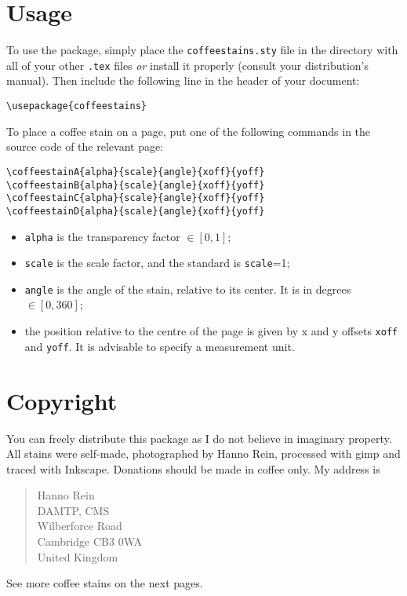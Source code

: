 \documentclass[a4paper, 11pt, BCOR = 0 pt, oneside, english]{scrartcl}
\begin{document}
\section{Usage}
To use the package, simply place the \texttt{coffeestains.sty} file in the directory with all of your 
other \texttt{.tex} files \textit{or} install it properly (consult your distribution's manual). 
Then include the following line in the header of your document:
\begin{verbatim}
\usepackage{coffeestains}
\end{verbatim}
\newpage{}
  \pagestyle{page2}
To place a coffee stain on a page, put one of the following commands in the source code of the relevant page: 
\begin{verbatim}
\coffeestainA{alpha}{scale}{angle}{xoff}{yoff}
\coffeestainB{alpha}{scale}{angle}{xoff}{yoff}
\coffeestainC{alpha}{scale}{angle}{xoff}{yoff}
\coffeestainD{alpha}{scale}{angle}{xoff}{yoff}
\end{verbatim}
\begin{itemize}
\item \texttt{alpha} is the transparency factor $\in [0,1]$;
\item \texttt{scale} is the scale factor, and the standard is \texttt{scale}=1;
\item \texttt{angle} is the angle of the stain, relative to its center. It is in
  degrees $\in [0,360]$;
\item the position relative to the centre of the page is given by x and
  y offsets \texttt{xoff} and \texttt{yoff}. It is advisable to specify
  a measurement unit.
\end{itemize}


\section{Copyright}
You can freely distribute this package as I do not believe in imaginary
property. All stains were self-made, photographed by Hanno Rein, processed with gimp
and traced with Inkscape. Donations should be made in coffee only. My address
is
\begin{quote}
Hanno Rein\\
DAMTP, CMS\\
Wilberforce Road\\
Cambridge CB3 0WA\\
United Kingdom
\end{quote}
See more coffee stains on the next pages.
\end{document}
